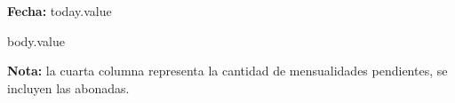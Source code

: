 \documentclass[12pt]{article}
\newcommand{\todayValue}{today.value}
\begin{document}
    
    \textbf{Fecha:} \todayValue
    
    body.value
    
    \textbf{Nota:} la cuarta columna representa la cantidad de mensualidades pendientes, se incluyen las abonadas. 
\end{document}
